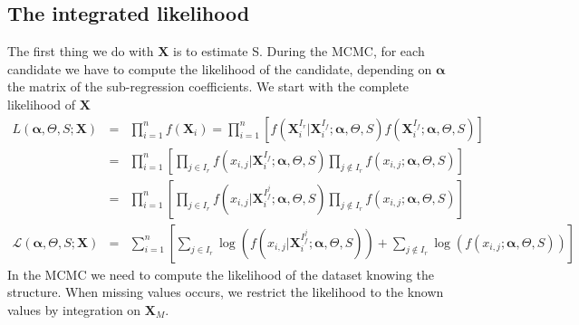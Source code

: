 \documentclass[12pt,a4paper]{report}
\begin{document}
\subsection{The integrated likelihood}
The first thing we do with $\boldsymbol{X}$ is to estimate S.
	 During the MCMC, for each candidate we have to compute the likelihood of the candidate, depending on $\boldsymbol{\alpha}$ the matrix of the sub-regression coefficients.
We start with the complete likelihood of $\boldsymbol{X}$
\begin{eqnarray}
	L(\boldsymbol{\alpha},\Theta,S;\boldsymbol{X})&=& \prod_{i=1}^n f(\boldsymbol{X}_i)= \prod_{i=1}^n\left[f(\boldsymbol{X}_i^{I_r}|\boldsymbol{X}_i^{I_f};\boldsymbol{\alpha},\Theta,S)f(\boldsymbol{X}_i^{I_f};\boldsymbol{\alpha},\Theta,S) \right] \\
	&=&\prod_{i=1}^n\left[\prod_{j \in I_r}f(x_{i,j}|\boldsymbol{X}_i^{I_f};\boldsymbol{\alpha},\Theta,S)\prod_{j \notin I_r} f(x_{i,j};\boldsymbol{\alpha},\Theta,S) \right] \\
	&=&\prod_{i=1}^n\left[\prod_{j \in I_r}f(x_{i,j}|\boldsymbol{X}_i^{I_f^j};\boldsymbol{\alpha},\Theta,S)\prod_{j \notin I_r} f(x_{i,j};\boldsymbol{\alpha},\Theta,S) \right] \\
	\mathcal{L}(\boldsymbol{\alpha},\Theta,S;\boldsymbol{X})&=&\sum_{i=1}^n\left[\sum_{j \in I_r}\log \left(f(x_{i,j}|\boldsymbol{X}_i^{I_f^j};\boldsymbol{\alpha},\Theta,S)\right)+\sum_{j \notin I_r} \log \left(f(x_{i,j};\boldsymbol{\alpha},\Theta,S)\right) \right] \label{loglikmiss}
\end{eqnarray}
		In the MCMC we need to compute the likelihood of the dataset knowing the structure. When missing values occurs, we restrict the likelihood to the known values by integration on $\boldsymbol{X}_M$.
				 		
\end{document}
